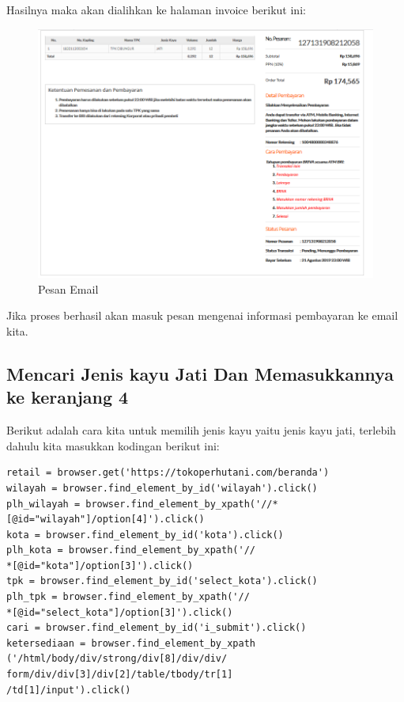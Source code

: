 Hasilnya maka akan dialihkan ke halaman invoice berikut ini:
\begin{figure}[h]
	\centering
	\includegraphics[scale=0.30]{figures/6invoice}
	\caption{Pesan Email}
\end{figure}

Jika proses berhasil akan masuk pesan mengenai informasi pembayaran ke email kita.

\newpage 
\subsection{Mencari Jenis kayu Jati Dan Memasukkannya ke keranjang 4}
Berikut adalah cara kita untuk memilih jenis kayu yaitu jenis kayu jati, terlebih dahulu kita masukkan kodingan berikut ini: 
\begin{verbatim}
retail = browser.get('https://tokoperhutani.com/beranda')
wilayah = browser.find_element_by_id('wilayah').click()
plh_wilayah = browser.find_element_by_xpath('//*
[@id="wilayah"]/option[4]').click()
kota = browser.find_element_by_id('kota').click()
plh_kota = browser.find_element_by_xpath('//
*[@id="kota"]/option[3]').click()
tpk = browser.find_element_by_id('select_kota').click()
plh_tpk = browser.find_element_by_xpath('//
*[@id="select_kota"]/option[3]').click()
cari = browser.find_element_by_id('i_submit').click()
ketersediaan = browser.find_element_by_xpath
('/html/body/div/strong/div[8]/div/div/
form/div/div[3]/div[2]/table/tbody/tr[1]
/td[1]/input').click()
\end{verbatim}

